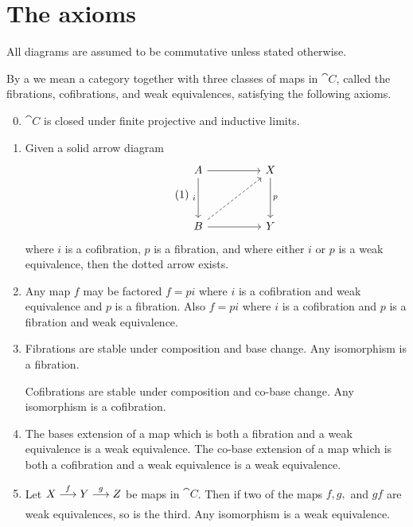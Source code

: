 \documentclass[../main]{subfiles}
\begin{document}
\section{The axioms}\label{sec:1.1}
All diagrams are assumed to be commutative unless stated otherwise.

\begin{definition}
\label{def:1.1.1}
By a  we mean a category together with three classes of maps in $\cat{C}$, called the fibrations, cofibrations, and weak equivalences, satisfying the following axioms.

\begin{enumerate}[label = M\arabic*]\setcounter{enumi}{-1}

\item\label{1.1.M0} $\cat{C}$ is closed under finite projective and inductive limits.
\item\label{1.1.M1} Given a solid arrow diagram
\[\tag{1}\label{diag:1.1.1}\begin{tikzcd}
	A && X \\ \\
	B && Y
	\arrow["i" left, from=1-1, to=3-1]
	\arrow["p", from=1-3, to=3-3]
	\arrow[from=1-1, to=1-3]
	\arrow[from=3-1, to=3-3]
	\arrow[dashed, from=3-1, to=1-3]
\end{tikzcd}\]
where $i$ is a cofibration, $p$ is a fibration, and where either $i$ or $p$ is a weak equivalence, then the dotted arrow exists.
\item\label{1.1.M2} Any map $f$ may be factored $f=p i$ where $i$ is a cofibration and weak equivalence and $p$ is a fibration. Also $f=p i$ where $i$ is a cofibration and $p$ is a fibration and weak equivalence.
\item\label{1.1.M3} Fibrations are stable under composition and base change. Any isomorphism is a fibration.

Cofibrations are stable under composition and co-base change. Any isomorphism is a cofibration.

\item\label{1.1.M4} The bases extension of a map which is both a fibration and a weak equivalence is a weak equivalence. The co-base extension of a map which is both a cofibration and a weak equivalence is a weak equivalence.

\item\label{1.1.M5} Let $X\varrightarrow{f} Y\varrightarrow{g}Z$ be maps in $\cat{C}$. Then if two of the maps $f,g,$ and $gf$ are weak equivalences, so is the third. Any isomorphism is a weak equivalence.
\end{enumerate}
\end{definition}
\end{document}
